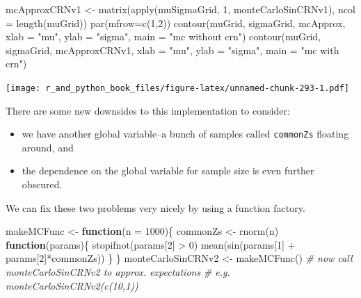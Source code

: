 \documentclass[
  12pt,
  krantz2]{krantz}
\makeatletter
\newenvironment{Shaded}{\begin{snugshade}}{\end{snugshade}}
\newcommand{\AttributeTok}[1]{\textcolor[rgb]{0.61,0.61,0.61}{#1}}
\newcommand{\CommentTok}[1]{\textcolor[rgb]{0.37,0.37,0.37}{\textit{#1}}}
\newcommand{\ControlFlowTok}[1]{\textcolor[rgb]{0.27,0.27,0.27}{\textbf{#1}}}
\newcommand{\DecValTok}[1]{\textcolor[rgb]{0.06,0.06,0.06}{#1}}
\newcommand{\FunctionTok}[1]{\textcolor[rgb]{0,0,0}{#1}}
\newcommand{\NormalTok}[1]{#1}
\newcommand{\OtherTok}[1]{\textcolor[rgb]{0.37,0.37,0.37}{#1}}
\newcommand{\SpecialCharTok}[1]{\textcolor[rgb]{0,0,0}{#1}}
\newcommand{\StringTok}[1]{\textcolor[rgb]{0.5,0.5,0.5}{#1}}
\providecommand{\tightlist}{%
  \setlength{\itemsep}{0pt}\setlength{\parskip}{0pt}}
\newenvironment{kframe}{%
\medskip{}
\setlength{\fboxsep}{.8em}
 \def\at@end@of@kframe{}%
 \ifinner\ifhmode%
  \def\at@end@of@kframe{\end{minipage}}%
  \begin{minipage}{\columnwidth}%
 \fi\fi%
 \def\FrameCommand##1{\hskip\@totalleftmargin \hskip-\fboxsep
 \colorbox{shadecolor}{##1}\hskip-\fboxsep
     \hskip-\linewidth \hskip-\@totalleftmargin \hskip\columnwidth}%
 \MakeFramed {\advance\hsize-\width
   \@totalleftmargin\z@ \linewidth\hsize
   \@setminipage}}%
 {\par\unskip\endMakeFramed%
 \at@end@of@kframe}
\renewenvironment{Shaded}{\begin{kframe}}{\end{kframe}}
\makeatother
\begin{document}
\begin{Shaded}
\begin{Highlighting}[]
\NormalTok{mcApproxCRNv1 }\OtherTok{\textless{}{-}} \FunctionTok{matrix}\NormalTok{(}\FunctionTok{apply}\NormalTok{(muSigmaGrid, }\DecValTok{1}\NormalTok{, monteCarloSinCRNv1), }
                        \AttributeTok{ncol =} \FunctionTok{length}\NormalTok{(muGrid))}
\FunctionTok{par}\NormalTok{(}\AttributeTok{mfrow=}\FunctionTok{c}\NormalTok{(}\DecValTok{1}\NormalTok{,}\DecValTok{2}\NormalTok{))}
\FunctionTok{contour}\NormalTok{(muGrid, sigmaGrid, mcApprox, }
        \AttributeTok{xlab =} \StringTok{"mu"}\NormalTok{, }\AttributeTok{ylab =} \StringTok{"sigma"}\NormalTok{, }\AttributeTok{main =} \StringTok{"mc without crn"}\NormalTok{)}
\FunctionTok{contour}\NormalTok{(muGrid, sigmaGrid, mcApproxCRNv1, }
        \AttributeTok{xlab =} \StringTok{"mu"}\NormalTok{, }\AttributeTok{ylab =} \StringTok{"sigma"}\NormalTok{, }\AttributeTok{main =} \StringTok{"mc with crn"}\NormalTok{)}
\end{Highlighting}
\end{Shaded}

\texttt{[image: r\_and\_python\_book\_files/figure-latex/unnamed-chunk-293-1.pdf]}

There are some new downsides to this implementation to consider:

\begin{itemize}
\tightlist
\item
  we have another global variable--a bunch of samples called \texttt{commonZs} floating around, and
\item
  the dependence on the global variable for sample size is even further obscured.
\end{itemize}

We can fix these two problems very nicely by using a function factory.

\begin{Shaded}
\begin{Highlighting}[]
\NormalTok{makeMCFunc }\OtherTok{\textless{}{-}} \ControlFlowTok{function}\NormalTok{(}\AttributeTok{n =} \DecValTok{1000}\NormalTok{)\{}
\NormalTok{  commonZs }\OtherTok{\textless{}{-}} \FunctionTok{rnorm}\NormalTok{(n)}
  \ControlFlowTok{function}\NormalTok{(params)\{}
    \FunctionTok{stopifnot}\NormalTok{(params[}\DecValTok{2}\NormalTok{] }\SpecialCharTok{\textgreater{}} \DecValTok{0}\NormalTok{) }
    \FunctionTok{mean}\NormalTok{(}\FunctionTok{sin}\NormalTok{(params[}\DecValTok{1}\NormalTok{] }\SpecialCharTok{+}\NormalTok{ params[}\DecValTok{2}\NormalTok{]}\SpecialCharTok{*}\NormalTok{commonZs))    }
\NormalTok{  \}  }
\NormalTok{\}}
\NormalTok{monteCarloSinCRNv2 }\OtherTok{\textless{}{-}} \FunctionTok{makeMCFunc}\NormalTok{()}
\CommentTok{\# now call monteCarloSinCRNv2 to approx. expectations}
\CommentTok{\# e.g. monteCarloSinCRNv2(c(10,1))}
\end{Highlighting}
\end{Shaded}
\end{document}
